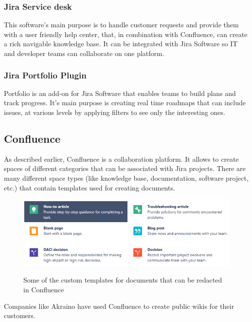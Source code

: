 		\subsubsection{Jira Service desk}\label{subsec:service_desk}
			This software's main purpose is to handle customer requests and provide them with a user friendly help center, that, in combination with Confluence, can create a rich navigable knowledge base.
			It can be integrated with Jira Software so IT and developer teams can collaborate on one platform.

		\subsubsection{Jira Portfolio Plugin}\label{subsec:portfolio}
			Portfolio is an add-on for Jira Software that enables teams to build plans and track progress.
			It's main purpose is creating real time roadmaps that can include issues, at various levels by applying filters to see only the interesting ones. 
		
	\subsection{Confluence}
		As described earlier, Confluence is a collaboration platform.
		It allows to create spaces of different categories that can be associated with Jira projects.
		There are many different space types (like knowledge base, documentation, software project, etc.) that contain templates used for creating documents.
		\begin{figure}[H]
			\centering
			\includegraphics[width=\textwidth]{resources/Annotation2019-07-24180136}\\
			\caption{Some of the custom templates for documents that can be redacted in Confluence}
		\end{figure}
		Companies like Akraino have used Confluence to create public wikis for their customers\cite{akraino}.
		

